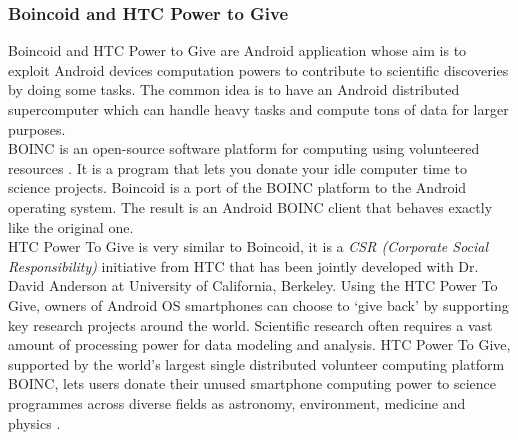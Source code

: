 \subsubsection{Boincoid and HTC Power to Give}
Boincoid and HTC Power to Give are Android application whose aim is  to exploit Android devices computation powers to contribute to scientific discoveries by doing some tasks. The common idea is to have an Android distributed supercomputer which can handle heavy tasks and compute tons of data for larger purposes.\\
BOINC is an open-source software platform for computing using volunteered resources \cite{boinc2017open}. It is a program that lets you donate your idle computer time to science projects. Boincoid is a port of the BOINC platform to the Android operating system. The result is an Android BOINC client that behaves exactly like the original one.\\
HTC Power To Give is very similar to Boincoid, it is a \textit{CSR (Corporate Social Responsibility)} initiative from HTC that has been jointly developed with Dr. David Anderson at University of California, Berkeley. Using the HTC Power To Give, owners of Android OS smartphones can choose to ‘give back’ by supporting key research projects around the world. Scientific research often requires a vast amount of processing power for data modeling and analysis. HTC Power To Give, supported by the world’s largest single distributed volunteer computing platform BOINC, lets users donate their unused smartphone computing power to science programmes across diverse fields as astronomy, environment, medicine and physics \cite{htc2017power}.

